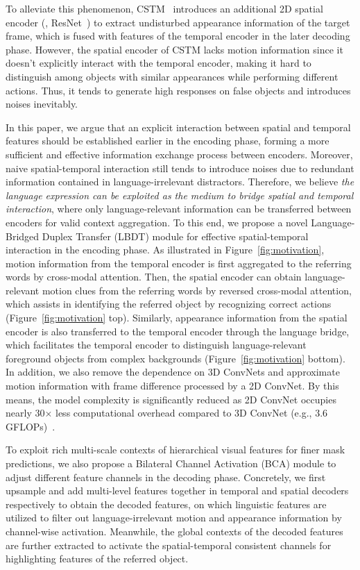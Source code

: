 \documentclass[10pt,twocolumn,letterpaper]{article}
\begin{document}
To alleviate this phenomenon, CSTM~\cite{HuiH0DLWH021} introduces an additional 2D spatial encoder (\eg, ResNet~\cite{He2016CVPR}) to extract undisturbed appearance information of the target frame, which is fused with features of the temporal encoder in the later decoding phase.
However, the spatial encoder of CSTM lacks motion information since it doesn't explicitly interact with the temporal encoder, making it hard to distinguish among objects with similar appearances while performing different actions.
Thus, it tends to generate high responses on false objects and introduces noises inevitably.

In this paper, we argue that an explicit interaction between spatial and temporal features should be established earlier in the encoding phase, forming a more sufficient and effective information exchange process between encoders. 
Moreover, naive spatial-temporal interaction still tends to introduce noises due to redundant information contained in language-irrelevant distractors. 
Therefore, we believe \textit{the language expression can be exploited as the medium to bridge spatial and temporal interaction}, where only language-relevant information can be transferred between encoders for valid context aggregation.
To this end, we propose a novel Language-Bridged Duplex Transfer (LBDT) module for effective spatial-temporal interaction in the encoding phase.
As illustrated in Figure~\ref{fig:motivation}, motion information from the temporal encoder is first aggregated to the referring words by cross-modal attention.
Then, the spatial encoder can obtain language-relevant motion clues from the referring words by reversed cross-modal attention, which assists in identifying the referred object by recognizing correct actions (Figure~\ref{fig:motivation} top).
Similarly, appearance information from the spatial encoder is also transferred to the temporal encoder through the language bridge, which facilitates the temporal encoder to distinguish language-relevant foreground objects from complex backgrounds (Figure~\ref{fig:motivation} bottom).
In addition, we also remove the dependence on 3D ConvNets and approximate motion information with frame difference processed by a 2D ConvNet.
By this means, the model complexity is significantly reduced as 2D ConvNet occupies nearly 30$\times$ less computational overhead compared to 3D ConvNet (e.g., 3.6  GFLOPs)~\cite{chen2018multi}.

To exploit rich multi-scale contexts of hierarchical visual features for finer mask predictions, we also propose a Bilateral Channel Activation (BCA) module to adjust different feature channels in the decoding phase. Concretely, we first upsample and add multi-level features together in temporal and spatial decoders respectively to obtain the decoded features, on which linguistic features are utilized to filter out language-irrelevant motion and appearance information by channel-wise activation. Meanwhile, the global contexts of the decoded features are further extracted to activate the spatial-temporal consistent channels for highlighting features of the referred object.
\end{document}
